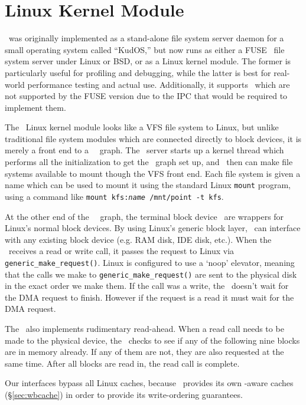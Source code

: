 \section{Linux Kernel Module}
\label{sec:linux}

\Kudos\ was originally implemented as a stand-alone file system server daemon
for a small operating system called ``KudOS,'' but now runs as either a
FUSE~\cite{fuse} file system server under Linux or BSD, or as a Linux kernel
module. The former is particularly useful for profiling and debugging, while the
latter is best for real-world performance testing and actual use. Additionally,
it supports \opgroups\ which are not supported by the FUSE version due to the
IPC that would be required to implement them.

The \Kudos\ Linux kernel module looks like a VFS file system to Linux, but
unlike traditional file system modules which are connected directly to block
devices, it is merely a front end to a \Kudos\ \module\ graph. The \Kudos\
server starts up a kernel thread which performs all the initialization to get
the \module\ graph set up, and \modules\ then can make file systems available to
mount though the VFS front end. Each file system is given a name which can be
used to mount it using the standard Linux \texttt{mount} program, using a
command like \mbox{\texttt{mount kfs:\textit{name} /mnt/point -t kfs}}.

At the other end of the \Kudos\ \module\ graph, the terminal block
device \modules\ are wrappers for Linux's normal block devices. By
using Linux's generic block layer, \Kudos\ can interface with any
existing block device (e.g. RAM disk, IDE disk, etc.). When the
\module\ receives a read or write call, it passes the request to Linux
via \texttt{generic\_make\_request()}. Linux is configured to use a
`noop' elevator, meaning that the calls we make to
\texttt{generic\_make\_request()} are sent to the physical disk in the
exact order we make them. If the call was a write, the \module\
doesn't wait for the DMA request to finish. However if the request is
a read it must wait for the DMA request.

The \module\ also implements rudimentary read-ahead. When a read call
needs to be made to the physical device, the \module\ checks to see if
any of the following nine blocks are in memory already. If any of them
are not, they are also requested at the same time. After all blocks
are read in, the read call is complete.

Our interfaces bypass all Linux caches, because \Kudos\ provides its
own \chdesc-aware caches (\S\ref{sec:wbcache}) in order to provide its
write-ordering guarantees.


